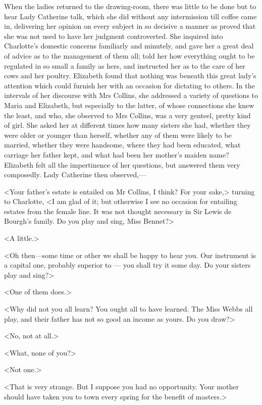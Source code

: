 When the ladies returned to the drawing-room, there was little to be done but to hear Lady Catherine talk, which she did without any intermission till coffee came in, delivering her opinion on every subject in so decisive a manner as proved that she was not used to have her judgment controverted. She inquired into Charlotte's domestic concerns familiarly and minutely, and gave her a great deal of advice as to the management of them all; told her how everything ought to be regulated in so small a family as hers, and instructed her as to the care of her cows and her poultry. Elizabeth found that nothing was beneath this great lady's attention which could furnish her with an occasion for dictating to others. In the intervals of her discourse with Mrs Collins, she addressed a variety of questions to Maria and Elizabeth, but especially to the latter, of whose connections she knew the least, and who, she observed to Mrs Collins, was a very genteel, pretty kind of girl. She asked her at different times how many sisters she had, whether they were older or younger than herself, whether any of them were likely to be married, whether they were handsome, where they had been educated, what carriage her father kept, and what had been her mother's maiden name? Elizabeth felt all the impertinence of her questions, but answered them very composedly. Lady Catherine then observed,—

<Your father's estate is entailed on Mr Collins, I think? For your sake,> turning to Charlotte, <I am glad of it; but otherwise I see no occasion for entailing estates from the female line. It was not thought necessary in Sir Lewis de Bourgh's family. Do you play and sing, Miss Bennet?>

<A little.>

<Oh then—some time or other we shall be happy to hear you. Our instrument is a capital one, probably superior to — you shall try it some day. Do your sisters play and sing?>

<One of them does.>

<Why did not you all learn? You ought all to have learned. The Miss Webbs all play, and their father has not so good an income as yours. Do you draw?>

<No, not at all.>

<What, none of you?>

<Not one.>

<That is very strange. But I suppose you had no opportunity. Your mother should have taken you to town every spring for the benefit of masters.>

